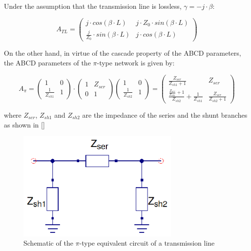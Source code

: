 \noindent Under the assumption that the transmission line is lossless, $\gamma = -j\cdot \beta$:

\begin{equation}
A_{TL} = \begin{pmatrix}
    j\cdot cos(\beta \cdot L)       & j \cdot Z_0 \cdot sin(\beta \cdot L) \\
    \frac{j}{Z_0} \cdot sin(\beta \cdot L) & j \cdot cos(\beta \cdot L)
\end{pmatrix}
\label{eq:ABCD_TL}
\end{equation}

\noindent On the other hand, in virtue of the cascade property of the ABCD parameters, the ABCD parameters of the $\pi$-type network is given by:

\begin{equation}
A_{\pi} = \begin{pmatrix}
     1       & 0 \\
   \frac{1}{Z_{sh1}} & 1
\end{pmatrix} \cdot
\begin{pmatrix}
     1       & Z_{ser} \\
    0 & 1
\end{pmatrix}
\begin{pmatrix}
     1       & 0 \\
    \frac{1}{Z_{sh2}} & 1
\end{pmatrix} = 
\begin{pmatrix}
     \frac{Z_{ser}}{Z_{sh1} + 1}      & Z_{ser} \\
     \frac{\frac{Z_{ser}}{Z_{sh1}}+ 1}{Z_{sh2}} + \frac{1}{Z_{sh1}} & \frac{Z_{ser}}{Z_{sh2} + 1} 
\end{pmatrix}
\label{eq:ABCD_PI}
\end{equation}

\noindent where $Z_{ser}$, $Z_{sh1}$ and $Z_{sh2}$ are the impedance of the series and the shunt branches as shown in \ref{} 

\begin{figure}[H]
\centering
\includegraphics[width=80mm]{pi-equivalent-circuit}
\caption{Schematic of the $\pi$-type equivalent circuit of a transmission line}
\label{fig:Transmission-Line-Circuit-Equivalent-Schematic}
\end{figure}

